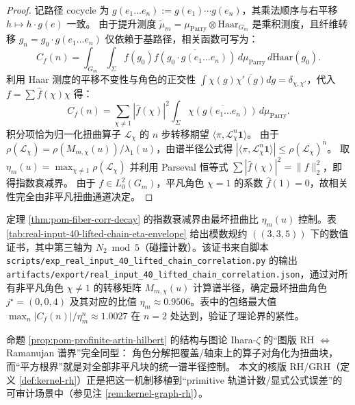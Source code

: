 \begin{proof}
记路径 cocycle 为 $g(e_1 \dots e_n) := g(e_1) \cdots g(e_n)$，其乘法顺序与右平移 $h \mapsto h \cdot g(e)$ 一致。
由于提升测度 $\widetilde\mu_m = \mu_{\mathrm{Parry}} \otimes \mathrm{Haar}_{G_m}$ 是乘积测度，且纤维转移 $g_n = g_0 \cdot g(e_1 \dots e_n)$ 仅依赖于基路径，相关函数可写为：
\[
C_f(n) = \int_{G_m} \int_{\Sigma} f(g_0) \overline{f(g_0 \cdot g(e_1 \dots e_n))} \, d\mu_{\mathrm{Parry}} \, d\mathrm{Haar}(g_0).
\]
利用 Haar 测度的平移不变性与角色的正交性 $\int \chi(g) \overline{\chi'(g)} dg = \delta_{\chi,\chi'}$，代入 $f = \sum \hat{f}(\chi) \chi$ 得：
\[
C_f(n) = \sum_{\chi \neq 1} |\hat{f}(\chi)|^2 \int_{\Sigma} \overline{\chi(g(e_1 \dots e_n))} \, d\mu_{\mathrm{Parry}}.
\]
积分项恰为归一化扭曲算子 $\mathcal{L}_\chi$ 的 $n$ 步转移期望 $\langle \pi, \mathcal{L}_\chi^n \mathbf{1} \rangle$。
由于 $\rho(\mathcal{L}_\chi) = \rho(M_{m,\chi}(u))/\lambda_1(u)$，由谱半径公式得 $|\langle \pi, \mathcal{L}_\chi^n \mathbf{1} \rangle| \le \rho(\mathcal{L}_\chi)^n$。
取 $\eta_m(u) = \max_{\chi \neq 1} \rho(\mathcal{L}_\chi)$ 并利用 Parseval 恒等式 $\sum |\hat{f}(\chi)|^2 = \|f\|_2^2$，即得指数衰减界。
由于 $f \in L^2_0(G_m)$，平凡角色 $\chi=1$ 的系数 $\hat{f}(1) = 0$，故相关性完全由非平凡扭曲通道决定。
\end{proof}

\begin{remark}[同余纤维相关衰减的数值证书]\label{rem:pom-fiber-corr-decay-certificate}
定理 \ref{thm:pom-fiber-corr-decay} 的指数衰减界由最坏扭曲比 $\eta_m(u)$ 控制。表 \ref{tab:real-input-40-lifted-chain-eta-envelope} 给出模数规约 $((3,3,5))$ 下的数值证书，其中第三轴为 $N_2 \bmod 5$（碰撞计数）。该证书来自脚本 \verb|scripts/exp_real_input_40_lifted_chain_correlation.py| 的输出 \verb|artifacts/export/real_input_40_lifted_chain_correlation.json|，通过对所有非平凡角色 $\chi \neq 1$ 的转移矩阵 $M_{m,\chi}(u)$ 计算谱半径，确定最坏扭曲角色 $j^\star=(0,0,4)$ 及其对应的比值 $\eta_m \approx 0.9506$。表中的包络最大值 $\max_n |C_f(n)|/\eta_m^n \approx 1.0027$ 在 $n=2$ 处达到，验证了理论界的紧性。


\end{remark}

\begin{remark}\label{rem:pom-profinite-ihara-ramanujan}
命题 \ref{prop:pom-profinite-artin-hilbert} 的结构与图论 Ihara-\(\zeta\) 的“图版 RH \(\Leftrightarrow\) Ramanujan 谱界”完全同型：
角色分解把覆盖/轴束上的算子对角化为扭曲块，而“平方根界”就是对全部非平凡块的统一谱半径控制。
本文的核版 RH/GRH（定义 \ref{def:kernel-rh}）正是把这一机制移植到“primitive 轨道计数/显式公式误差”的可审计场景中（参见注 \ref{rem:kernel-graph-rh}）。
\end{remark}

